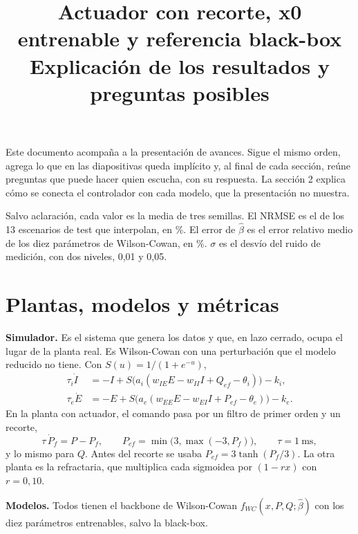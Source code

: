 \documentclass[10pt,a4paper]{article}
\title{Actuador con recorte, x0 entrenable y referencia black-box\\[2mm]\large Explicación de los resultados y preguntas posibles}
\date{}
\author{}
\newcommand{\bh}{\hat\beta}
\begin{document}
\maketitle
\vspace{-12mm}

Este documento acompaña a la presentación de avances. Sigue el mismo orden, agrega lo que en las diapositivas queda implícito y, al final de cada sección, reúne preguntas que puede hacer quien escucha, con su respuesta. La sección 2 explica cómo se conecta el controlador con cada modelo, que la presentación no muestra.

Salvo aclaración, cada valor es la media de tres semillas. El NRMSE es el de los 13 escenarios de test que interpolan, en \%. El error de $\bh$ es el error relativo medio de los diez parámetros de Wilson-Cowan, en \%. $\sigma$ es el desvío del ruido de medición, con dos niveles, 0,01 y 0,05.

\section{Plantas, modelos y métricas}

\textbf{Simulador.} Es el sistema que genera los datos y que, en lazo cerrado, ocupa el lugar de la planta real. Es Wilson-Cowan con una perturbación que el modelo reducido no tiene. Con $S(u) = 1/(1+e^{-u})$,
\begin{align*}
\tau_i \dot I &= -I + S\big(a_i (w_{IE}E - w_{II}I + Q_{ef} - \theta_i)\big) - k_i,\\
\tau_e \dot E &= -E + S\big(a_e (w_{EE}E - w_{EI}I + P_{ef} - \theta_e)\big) - k_e .
\end{align*}
En la planta con actuador, el comando pasa por un filtro de primer orden y un recorte,
\[
\tau\,\dot P_f = P - P_f, \qquad P_{ef} = \min\!\big(3, \max(-3, P_f)\big), \qquad \tau = 1\ \text{ms},
\]
y lo mismo para $Q$. Antes del recorte se usaba $P_{ef} = 3\tanh(P_f/3)$. La otra planta es la refractaria, que multiplica cada sigmoidea por $(1 - r x)$ con $r = 0{,}10$.

\textbf{Modelos.} Todos tienen el backbone de Wilson-Cowan $f_{WC}(x, P, Q; \bh)$ con los diez parámetros entrenables, salvo la black-box.
\end{document}
